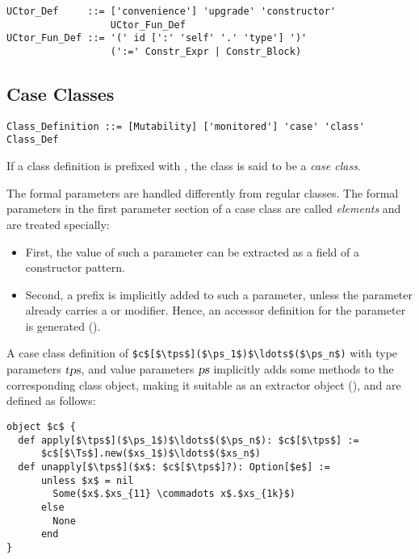 \grammar\begin{lstlisting}
UCtor_Def     ::= ['convenience'] 'upgrade' 'constructor' 
                  UCtor_Fun_Def
UCtor_Fun_Def ::= '(' id [':' 'self' '.' 'type'] ')'
                  (':=' Constr_Expr | Constr_Block)
\end{lstlisting}







\subsection{Case Classes}
\label{sec:case-classes}

\grammar\begin{lstlisting}
Class_Definition ::= [Mutability] ['monitored'] 'case' 'class' Class_Def
\end{lstlisting}

If a class definition is prefixed with , the class is said to be a {\em case class}. 

The formal parameters are handled differently from regular classes. The formal parameters in the first parameter section of a case class are called {\em elements} and are treated specially:
\begin{itemize}
\item[] First, the value of such a parameter can be extracted as a field of a constructor pattern. 
\item[] Second, a  prefix is implicitly added to such a parameter, unless the parameter already carries a  or  modifier. Hence, an accessor definition for the parameter is generated (). 
\end{itemize}

A case class definition of \lstinline!$c$[$\tps$]($\ps_1$)$\ldots$($\ps_n$)! with type parameters $\mbox{\sl tps}$, and value parameters $\mbox{\sl ps}$ implicitly adds some methods to the corresponding class object, making it suitable as an extractor object (), and are defined as follows:
\begin{lstlisting}
object $c$ {
  def apply[$\tps$]($\ps_1$)$\ldots$($\ps_n$): $c$[$\tps$] := 
      $c$[$\Ts$].new($xs_1$)$\ldots$($xs_n$)
  def unapply[$\tps$]($x$: $c$[$\tps$]?): Option[$e$] :=
      unless $x$ = nil
        Some($x$.$xs_{11} \commadots x$.$xs_{1k}$)
      else
        None
      end
}
\end{lstlisting}

